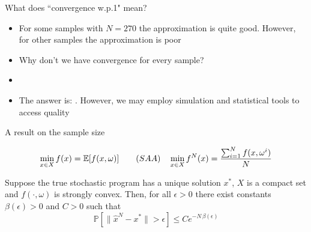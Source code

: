 \begin{frame}{What does ``convergence w.p.1" mean?}


\begin{itemize}
\item For some samples with $N=270$ the approximation is quite good. However, for other samples the approximation is poor
\pula

\item Why don't we have convergence for every sample?
\pula
\pause

\item {}
\end{itemize}

\pula
{}

\pause
\begin{itemize}
\item The answer is: . However, we may employ simulation and statistical tools to access quality
\end{itemize}

 \end{frame}


\begin{frame}{A result on the sample size}

\[
 \min_{x \in X} f(x)=\mathbb{E}[f(x,\omega)] \quad \quad (SAA) \quad \min_{x \in X} f^N(x)=\frac{\sum_{i=1}^N f(x,\omega^i)}{N}
\]


\begin{theorem}
Suppose the true stochastic program has a unique solution $x^*$, $X$ is a compact set and $f(\cdot, \omega)$ is strongly convex.
Then, for all $\epsilon >0$ there exist constants $\beta(\epsilon)>0$ and $C>0$ such that
\[
\mathbb{P}[\|\hat x^N- x^*\|>\epsilon] \leq  C e^{-N\,\beta(\epsilon)}
\]

\pause

\pula

\end{theorem}

 \end{frame}



